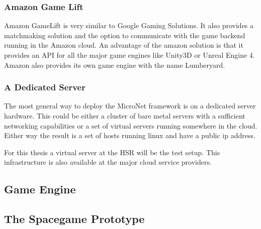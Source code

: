 \subsubsection{Amazon Game Lift}

Amazon GameLift is very similar to Google Gaming Solutions. It also provides a
matchmaking solution and the option to communicate with the game backend running
in the Amazon cloud. An advantage of the amazon solution is that it provides an
API for all the major game engines like Unity3D or Unreal Engine 4. Amazon also
provides its own game engine with the name Lumberyard.

\subsubsection{A Dedicated Server}

The most general way to deploy the MicroNet framework is on a dedicated server
hardware. This could be either a cluster of bare metal servers with a sufficient
networking capabilities or a set of virtual servers running somewhere in the
cloud. Either way the result is a set of hosts running linux and have a public
ip address.

For this thesis a virtual server at the HSR will be the test setup. This
infrastructure is also available at the major cloud service providers.



\subsection{Game Engine}

\subsection{The Spacegame Prototype}

